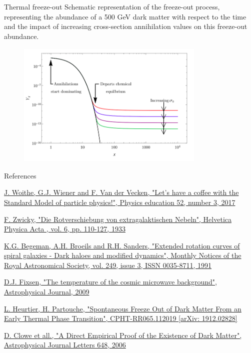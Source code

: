 \documentclass[8pt]{beamer}
\newcommand{\backupend}{
   \setcounter{framenumber}{\value{finalframe}}
}
\begin{document}
\begin{frame}{Thermal freeze-out}
\justifying
\vspace{5pt}
Schematic representation of the freeze-out process, representing the abundance of a
500 GeV dark matter with respect to the time and the impact of increasing cross-section annihilation
values on this freeze-out abundance. \vfill

\begin{figure}[htbp]
\begin{center}
\includegraphics[width=9cm, height=6cm]{figs/FreezeOut.png}
\end{center}
\end{figure} \vfill
\end{frame}

\backupend

\begin{frame}{References}
\justifying

\begin{thebibliography}{1}
\href{https://arxiv.org/abs/1808.10518}{J. Woithe, G.J. Wiener and F. Van der Vecken,
"Let's have a coffee with the Standard Model of particle physics!",
Physics education 52, number 3, 2017
}

\href{http://articles.adsabs.harvard.edu/cgi-bin/nph-iarticle_query?1933AcHPh...6..110Z&amp;data_type=PDF_HIGH&amp;whole_paper=YES&amp;type=PRINTER&amp;filetype=.pdf}{
F. Zwicky,
"Die Rotverschiebung von extragalaktischen Nebeln",
Helvetica Physica Acta , vol. 6, pp. 110-127, 1933}

\href{https://academic.oup.com/mnras/article/249/3/523/1005565}{K.G. Begeman, A.H. Broeils and R.H. Sanders,
"Extended rotation curves of spiral galaxies - Dark haloes and modified dynamics",
Monthly Notices of the Royal Astronomical Society, vol. 249, issue 3, ISSN 0035-8711, 1991}

\href{https://iopscience.iop.org/article/10.1088/0004-637X/707/2/916}{D.J. Fixsen,
"The temperature of the cosmic microwave background",
Astrophysical Journal, 2009
}

\href{https://arxiv.org/abs/1912.02828}{L. Heurtier, H. Partouche,
"Spontaneous Freeze Out of Dark Matter From an Early Thermal Phase Transition",
CPHT-RR065.112019 [arXiv: 1912.02828]}

\href{https://iopscience.iop.org/article/10.1086/508162}{D. Clowe et all.,
"A Direct Empirical Proof of the Existence of Dark Matter",
Astrophysical Journal Letters 648, 2006
}
\end{thebibliography}
\end{frame}
\end{document}
